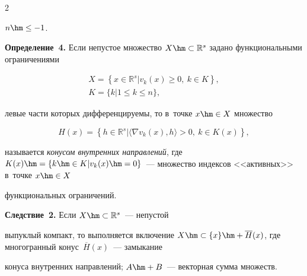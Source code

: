 \begin{multicols}{2}
\begin{enumerate}[1.]
\begin{itemize}
$n\hm\leq -1$.


  \end{itemize}


  \end{enumerate}


  


  \noindent


  \textbf{Определение~4.} Если непустое множество $X\hm\subset 


\mathbb{R}^s$ задано функциональными ограничениями


\begin{multline*}




  X=\left\{ x\in \mathbb{R}^s\vert v_k(x)\geq 0,\ k\in K\right\},\\


  K=\{ k\vert 1\leq k\leq n\},




\end{multline*}


левые части которых дифференцируемы, то в~точке $x\hm\in X$ множество


$$


H(x)=\left\{ h\in \mathbb{R}^s\vert \langle \nabla v_k(x),h\rangle>0, \ k\in 


K(x)\right\},


$$


называется \textit{конусом внутренних направлений}, где $K(x)\hm= \{k\hm\in K\vert 


v_k(x)\hm=0\}$~--- множество индексов <<активных>> в~точке $x\hm\in X$ 


функциональных ограничений.





\smallskip





\noindent


\textbf{Следствие~2.} Если $X\hm\subset \mathbb{R}^s$~--- непустой 


выпуклый компакт, то выполняется включение $X\hm\subset \{x\}\hm+ 


\overline{H}(x)$, где многогранный конус~$\overline{H}(x)$~--- замыкание 


конуса внутренних направлений; $A\hm+B$~--- векторная сумма множеств.






\end{multicols}

